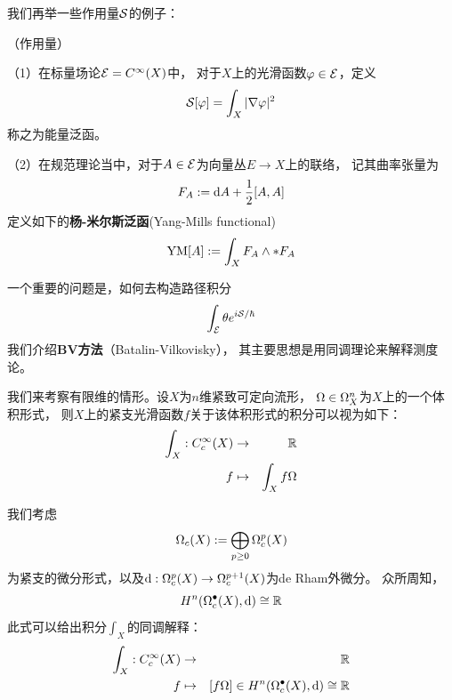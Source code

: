 我们再举一些作用量$\mathcal{S}$的例子：

\begin{example}（作用量）

（1）在标量场论$\mathcal{E}=C^{\infty}(X)$中，
对于$X$上的光滑函数$\varphi\in\mathcal{E}$，定义
$$\mathcal{S}[\varphi]=\int_X|\nabla\varphi|^2$$
称之为能量泛函。

（2）在规范理论当中，对于$A\in\mathcal{E}$为向量丛$E\to X$上的联络，
记其曲率张量为
$$F_A:=\mathrm{d} A+\frac{1}{2}[A,A]$$
定义如下的\textbf{杨-米尔斯泛函}(Yang-Mills functional)
$$\operatorname{YM}[A]:=\int_XF_A\wedge*F_A$$

\end{example}


一个重要的问题是，如何去构造路径积分
$$\int_{\mathcal{E}}\theta e^{i\mathcal{S}/\hbar}$$
我们介绍\textbf{BV方法}（Batalin-Vilkovisky），
其主要思想是用同调理论来解释测度论。


我们来考察有限维的情形。设$X$为$n$维紧致可定向流形，
$\Omega\in\Omega_X^n$为$X$上的一个体积形式，
则$X$上的紧支光滑函数$f$关于该体积形式的积分可以视为如下：
\begin{eqnarray*}
\int_X: C^{\infty}_c(X)&\to&\mathbb{R}\\
f&\mapsto&\int_Xf\Omega
\end{eqnarray*}


我们考虑
$$\Omega_c(X):=\bigoplus_{p\geq 0}\Omega_c^p(X)$$
为紧支的微分形式，以及$\mathrm{d}:\Omega_c^p(X)\to\Omega_c^{p+1}(X)$为de Rham外微分。
众所周知，
$$H^n(\Omega_c^{\bullet}(X),\mathrm{d})\cong\mathbb{R}$$
此式可以给出积分$\int_X$的同调解释：
\begin{eqnarray*}
\int_X:C_c^{\infty}(X)&\to&\mathbb{R}\\
f&\mapsto&[f\Omega]\in H^n(\Omega_c^{\bullet}(X),\mathrm{d})\cong\mathbb{R}
\end{eqnarray*}

